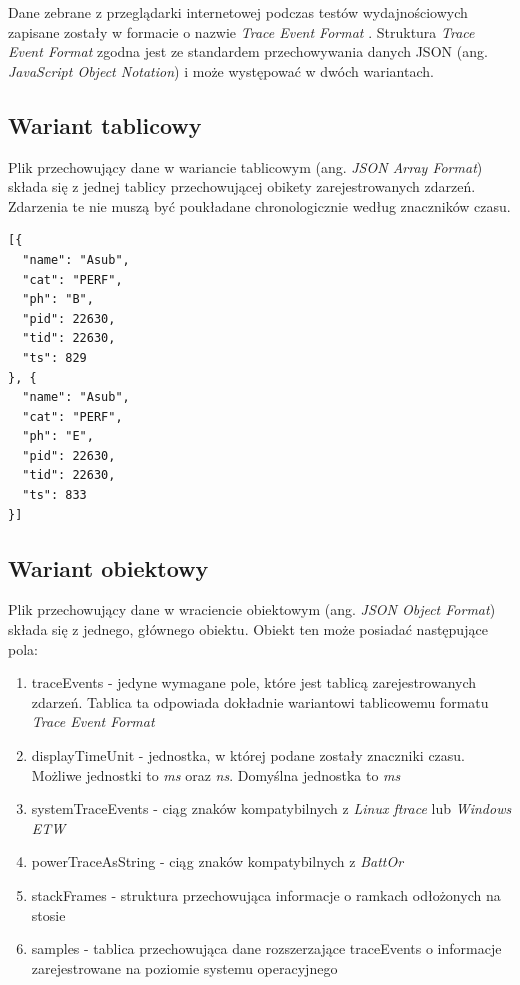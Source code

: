 \documentclass[polish, twoside, 12pt]{mwart}
\begin{document}
Dane zebrane z przeglądarki internetowej podczas testów wydajnościowych zapisane zostały w formacie o nazwie \emph{Trace Event Format} \cite{trace-event-format}. Struktura \emph{Trace Event Format} zgodna jest ze standardem przechowywania danych JSON (ang. \emph{JavaScript Object Notation}) \cite{json} i może występować w dwóch wariantach.

\subsection{Wariant tablicowy}

Plik przechowujący dane w wariancie tablicowym (ang. \emph{JSON Array Format}) składa się z jednej tablicy przechowującej obikety zarejestrowanych zdarzeń. Zdarzenia te nie muszą być poukładane chronologicznie według znaczników czasu. 

\begin{lstlisting}[caption=Przykładowy wariant tablicowy]
[{
  "name": "Asub",
  "cat": "PERF",
  "ph": "B",
  "pid": 22630,
  "tid": 22630,
  "ts": 829
}, {
  "name": "Asub",
  "cat": "PERF",
  "ph": "E",
  "pid": 22630,
  "tid": 22630,
  "ts": 833
}]
\end{lstlisting}

\subsection{Wariant obiektowy}

Plik przechowujący dane w wraciencie obiektowym (ang. \emph{JSON Object Format}) składa się z jednego, głównego obiektu. Obiekt ten może posiadać następujące pola:

\begin{enumerate}
  \item traceEvents - jedyne wymagane pole, które jest tablicą zarejestrowanych zdarzeń. Tablica ta odpowiada dokładnie wariantowi tablicowemu formatu \emph{Trace Event Format}
  \item displayTimeUnit - jednostka, w której podane zostały znaczniki czasu. Możliwe jednostki to \emph{ms} oraz \emph{ns}. Domyślna jednostka to \emph{ms}
  \item systemTraceEvents - ciąg znaków kompatybilnych z \emph{Linux ftrace} \cite{ftrace} lub \emph{Windows ETW} \cite{etw}
  \item powerTraceAsString - ciąg znaków kompatybilnych z \emph{BattOr} \cite {battor}
  \item stackFrames - struktura przechowująca informacje o ramkach odłożonych na stosie
  \item samples - tablica przechowująca dane rozszerzające traceEvents o informacje zarejestrowane na poziomie systemu operacyjnego 
\end{enumerate}
\end{document}
